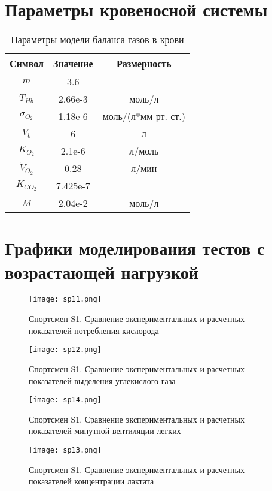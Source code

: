 \chapter{Параметры кровеносной системы} 
\begin{table}[!ht]
\centering
\caption{Параметры модели баланса газов в крови}
\medskip
\label{tabular:tab3}
\begin{tabular}{|c|c|c|}
\hline
Символ & Значение & Размерность \\
\hline
\(m\) & 3.6 &  \\
\hline
\(T_{Hb}\) & 2.66e-3 & моль\slash л \\
\hline
\(\sigma_{O_{2}}\) & 1.18e-6 & моль\slash (л*мм рт. ст.) \\
\hline
\(V_{b}\) & 6 & л \\
\hline
\(K_{O_{2}}\) & 2.1e-6 & л\slash моль\\
\hline
\( \dot{V}_{O_{2}}\) & 0.28 & л\slash мин \\
\hline
\(K_{CO_{2}}\) & 7.425e-7& \\
\hline
\(M\) & 2.04e-2& моль\slash л \\
\hline
\end{tabular}
\end{table}

\chapter{Графики моделирования тестов с возрастающей нагрузкой}
\label{AppendixС}

\begin{figure}[!ht]
	\centering
	\texttt{[image: sp11.png]}
	\caption{Спортсмен S1. Сравнение экспериментальных и расчетных показателей потребления кислорода } 
\end{figure}

\begin{figure}[!ht]
	\centering
	\texttt{[image: sp12.png]}
	\caption{Спортсмен S1. Сравнение экспериментальных и расчетных показателей выделения углекислого газа} 
\end{figure}

\begin{figure}[!ht]
	\centering
	\texttt{[image: sp14.png]}
	\caption{Спортсмен S1. Сравнение экспериментальных и расчетных показателей минутной вентиляции легких} 
\end{figure}

\begin{figure}[!ht]
	\centering
	\texttt{[image: sp13.png]}
	\caption{Спортсмен S1. Сравнение экспериментальных и расчетных показателей концентрации лактата} 
\end{figure}

